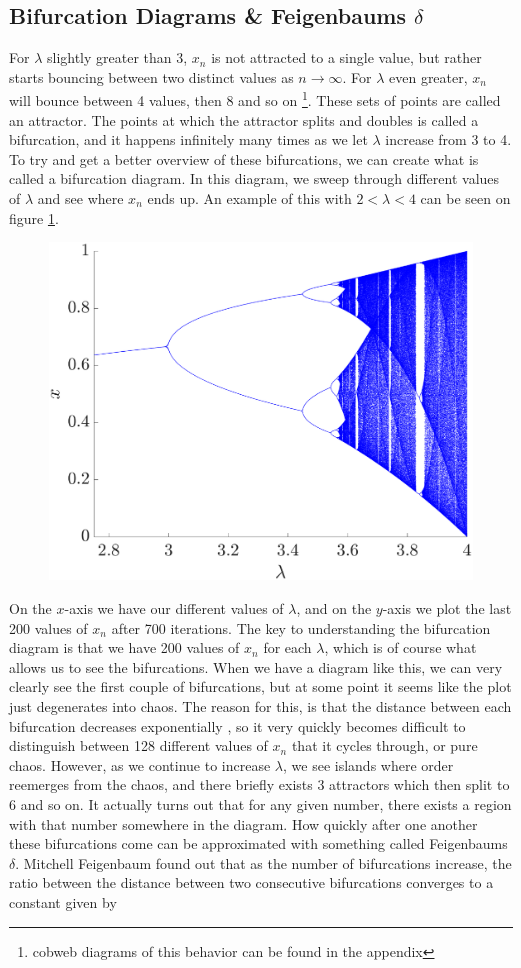 \documentclass[12pt,oneside,a4paper]{article}
\numberwithin{equation}{section}
\begin{document}
{{{{\subsection{Bifurcation Diagrams \& Feigenbaums $\delta$}
For $\lambda$ slightly greater than 3, $x_n$ is not attracted to a single value, but rather starts bouncing between two distinct values as $n \rightarrow \infty$. For $\lambda$ even greater, $x_n$ will bounce between 4 values, then 8 and so on \footnote{cobweb diagrams of this behavior can be found in the appendix}. These sets of points are called an attractor. The points at which the attractor splits and doubles is called a bifurcation, and it happens infinitely many times as we let $\lambda$ increase from 3 to 4. To try and get a better overview of these bifurcations, we can create what is called a bifurcation diagram. In this diagram, we sweep through different values of $\lambda$ and see where $x_n$ ends up. An example of this with $2<\lambda<4$ can be seen on figure \ref{bifurcation}.
\begin{figure}
	\centering
	\includegraphics[width=0.8\linewidth]{Figures/Bifurcation}
	\caption{}
	\label{bifurcation}
\end{figure}
On the $x$-axis we have our different values of $\lambda$, and on the $y$-axis we plot the last 200 values of $x_n$ after 700 iterations. The key to understanding the bifurcation diagram is that we have 200 values of $x_n$ for each $\lambda$, which is of course what allows us to see the bifurcations. When we have a diagram like this, we can very clearly see the first couple of bifurcations, but at some point it seems like the plot just degenerates into chaos. The reason for this, is that the distance between each bifurcation decreases exponentially \cite{strogatz}, so it very quickly becomes difficult to distinguish between 128 different values of $x_n$ that it cycles through, or pure chaos. However, as we continue to increase $\lambda$, we see islands where order reemerges from the chaos, and there briefly exists 3 attractors which then split to 6 and so on. It actually turns out that for any given number, there exists a region with that number somewhere in the diagram. How quickly after one another these bifurcations come can be approximated with something called Feigenbaums $\delta$. Mitchell Feigenbaum found out that as the number of bifurcations increase, the ratio between the distance between two consecutive bifurcations converges to a constant given by
}}}}
\end{document}
